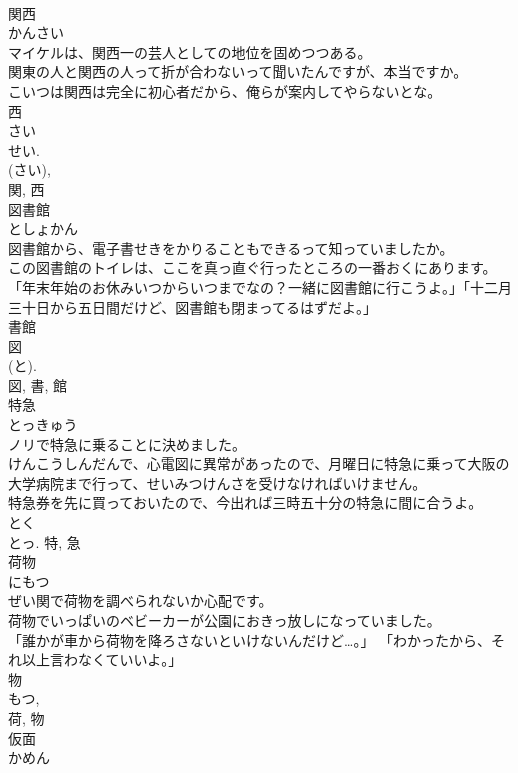 \documentclass[8pt]{extreport}
\begin{document}
\begin{CJK}{UTF8}{min}
\\	関西	
\\	かんさい	
\\	マイケルは、関西一の芸人としての地位を固めつつある。	
\\	関東の人と関西の人って折が合わないって聞いたんですが、本当ですか。	
\\	こいつは関西は完全に初心者だから、俺らが案内してやらないとな。	
\\	西 
\\	さい 
\\	せい. 
\\	(さい), 
\\	関, 西	
\\	図書館	
\\	としょかん	
\\	図書館から、電子書せきをかりることもできるって知っていましたか。	
\\	この図書館のトイレは、ここを真っ直ぐ行ったところの一番おくにあります。	
\\	「年末年始のお休みいつからいつまでなの？一緒に図書館に行こうよ。」「十二月三十日から五日間だけど、図書館も閉まってるはずだよ。」	
\\	書館 
\\	図 
\\	(と). 
\\	図, 書, 館	
\\	特急	
\\	とっきゅう	
\\	ノリで特急に乗ることに決めました。	
\\	けんこうしんだんで、心電図に異常があったので、月曜日に特急に乗って大阪の大学病院まで行って、せいみつけんさを受けなければいけません。	
\\	特急券を先に買っておいたので、今出れば三時五十分の特急に間に合うよ。	
\\	とく 
\\	とっ.	特, 急	
\\	荷物	
\\	にもつ	
\\	ぜい関で荷物を調べられないか心配です。	
\\	荷物でいっぱいのベビーカーが公園におきっ放しになっていました。	
\\	「誰かが車から荷物を降ろさないといけないんだけど…。」 「わかったから、それ以上言わなくていいよ。」	
\\	物 
\\	もつ, 
\\	荷, 物	
\\	仮面	
\\	かめん	

\end{CJK}
\end{document}
